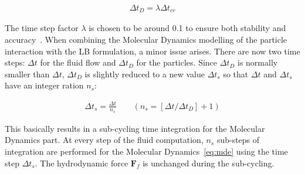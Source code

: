 \begin{align}
\Delta \mathit{t}_{D}=\lambda \Delta \mathit{t}_{cr}
\end{align}

The time step factor $\lambda$ is chosen to be around 0.1 to ensure both 
stability and accuracy~\citep{He1997}. When combining the Molecular Dynamics 
modelling of the particle interaction with the LB formulation, a minor issue 
arises. There are now two time steps: $\Delta t$ for the fluid flow and $\Delta 
t_{D}$ for the particles. Since $\Delta t_{D}$ is normally smaller than $\Delta 
t$, $\Delta t_{D}$ is slightly reduced to a new value $\Delta t_{s}$ so that 
$\Delta t$ and $\Delta t_{s}$ have an integer ration $\mathit{n}_{\mathit{s}}$:

\begin{align}
\Delta t_{s}=\frac{\Delta t}{\mathit{n}_{s}} \qquad(\mathit{n}_{s}=[\Delta t/ 
\Delta t_{D}]+1)
\end{align} 

This basically results in a sub-cycling time integration for the Molecular 
Dynamics part. At every step of the fluid computation, $\mathit{n}_{s}$ 
sub-steps of integration are performed for the Molecular 
Dynamics~\eqref{eq:mde} using the time step $\Delta t_{s}$. The hydrodynamic 
force $\mathbf{F}_{f}$ is unchanged during the sub-cycling. 
